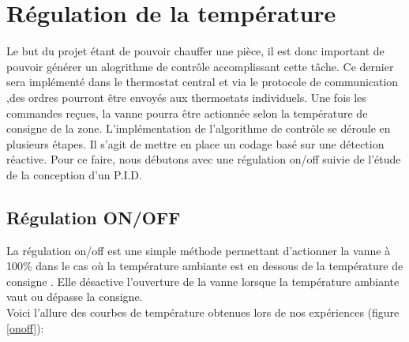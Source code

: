 \documentclass[12pt]{report}
\begin{document}
\chapter{R\'{e}gulation de la température}
Le but du projet \'{e}tant de pouvoir chauffer une  pi\`{e}ce, il est donc important de pouvoir générer un alogrithme de contr\^{o}le accomplissant cette t\^{a}che. Ce dernier sera impl\'{e}ment\'{e} dans le thermostat central et via le protocole de communication ,des ordres pourront être envoy\'{e}s aux thermostats individuels. Une fois les commandes reçues, la vanne pourra \^etre actionn\'{e}e selon la temp\'{e}rature de consigne de la zone. 
L'impl\'ementation de l'algorithme de contr\^ole se d\'eroule en plusieurs \'{e}tapes. Il s'agit de mettre en place un codage bas\'{e} sur une d\'etection r\'eactive. Pour ce faire, nous d\'{e}butons avec une r\'{e}gulation on/off suivie de l'\'{e}tude de la conception d'un P.I.D.

\section{Régulation ON/OFF}
La r\'{e}gulation on/off est une simple m\'{e}thode permettant d'actionner la vanne à 100\% dans le cas o\`{u} la temp\'{e}rature ambiante est en dessous de la temp\'{e}rature de consigne . Elle d\'{e}sactive l'ouverture de la vanne lorsque la température ambiante vaut ou dépasse la consigne.\\
Voici l'allure des courbes de température obtenues lors de nos expériences (figure \ref{onoff}):
\end{document}
